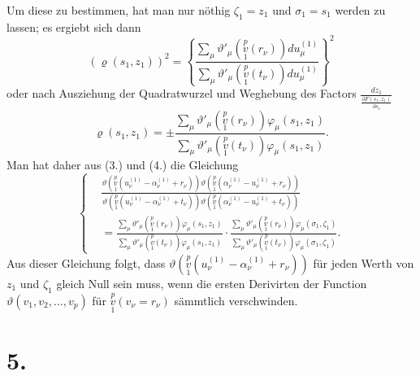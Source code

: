 \documentclass{article}
\begin{document}
Um diese zu bestimmen, hat man nur nöthig $\zeta_1 = z_1$ und $\sigma_1 = s_1$ werden zu lassen; es ergiebt sich dann
\[
(\varrho(s_1, z_1))^2 = \left\{\frac{\sum_\mu \vartheta'_\mu\left(\overset{p}{\underset{1}{v}}(r_\nu)\right) du_\mu^{(1)}}{\sum_\mu \vartheta'_\mu\left(\overset{p}{\underset{1}{v}}(t_\nu)\right) du_\mu^{(1)}}\right\}^2
\]
oder nach Ausziehung der Quadratwurzel und Weghebung des Factors $\displaystyle\frac{dz_1}{\displaystyle\frac{\partial F(s_1, z_1)}{\partial s_1}}$
\[
\tag{(4.)}
\varrho(s_1, z_1) = \pm \frac{\sum_\mu \vartheta'_\mu\left(\overset{p}{\underset{1}{v}}(r_\nu)\right) \varphi_\mu(s_1, z_1)}{\sum_\mu \vartheta'_\mu\left(\overset{p}{\underset{1}{v}}(t_\nu)\right) \varphi_\mu(s_1, z_1)}.
\]
Man hat daher aus (3.) und (4.) die Gleichung
\[
\tag{(5.)}
\left\{
\begin{aligned}
& \frac{\vartheta\left(\overset{p}{\underset{1}{v}}(u_\nu^{(1)} - \alpha_\nu^{(1)} + r_\nu)\right)\vartheta\left(\overset{p}{\underset{1}{v}}(\alpha_\nu^{(1)} - u_\nu^{(1)} + r_\nu)\right)}{\vartheta\left(\overset{p}{\underset{1}{v}}(u_\nu^{(1)} - \alpha_\nu^{(1)} + t_\nu)\right)\vartheta\left(\overset{p}{\underset{1}{v}}(\alpha_\nu^{(1)} - u_\nu^{(1)} + t_\nu)\right)} \\
&= \frac{\sum_\mu \vartheta'_\mu\left(\overset{p}{\underset{1}{v}}(r_\nu)\right) \varphi_\mu(s_1, z_1)}{\sum_\mu \vartheta'_\mu\left(\overset{p}{\underset{1}{v}}(t_\nu)\right) \varphi_\mu(s_1, z_1)} \cdot \frac{\sum_\mu \vartheta'_\mu\left(\overset{p}{\underset{1}{v}}(r_\nu)\right) \varphi_\mu(\sigma_1, \zeta_1)}{\sum_\mu \vartheta'_\mu\left(\overset{p}{\underset{1}{v}}(t_\nu)\right) \varphi_\mu(\sigma_1, \zeta_1)}.
\end{aligned}
\right.
\]
Aus dieser Gleichung folgt, dass $\vartheta\left(\overset{p}{\underset{1}{v}}(u_\nu^{(1)} - \alpha_\nu^{(1)} + r_\nu)\right)$ für jeden Werth
von $z_1$ und $\zeta_1$ gleich Null sein muss, wenn die ersten Derivirten der Function $\vartheta(v_1, v_2, \dots, v_p)$ für $\overset{p}{\underset{1}{v}}(v_\nu = r_\nu)$ sämmtlich verschwinden.

\section*{5.}
\end{document}
